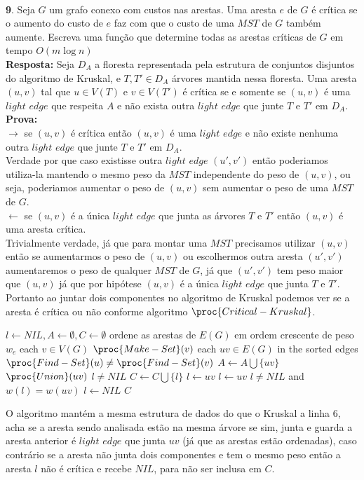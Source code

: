 \\[6pt]
\noindent \textbf{9}. Seja $G$ um grafo conexo com custos nas arestas. Uma aresta $e$ de $G$ é crítica se o aumento do custo de $e$ faz com que o custo de uma $MST$ de $G$ também aumente. Escreva uma função que determine todas as arestas críticas de $G$ em tempo $O(m \log n)$
\\[6pt]
\noindent \textbf{Resposta:} Seja $D_A$ a floresta representada pela estrutura de conjuntos disjuntos do algoritmo de Kruskal, e $T, T' \in D_A$ árvores mantida nessa floresta. Uma aresta $(u,v)$ tal que $u \in V(T)$ e $v \in V(T')$ é crítica se e somente se $(u,v)$ é uma $light$ $edge$ que respeita $A$ e não exista outra $light$ $edge$ que junte $T$ e $T'$ em $D_A$.
\\[6pt]
\noindent \textbf{Prova:}
\\[6pt]
\noindent $\rightarrow$ se $(u,v)$ é crítica então $(u,v)$ é uma $light$ $edge$ e não existe nenhuma outra $light$ $edge$ que junte $T$ e $T'$ em $D_A$.
\\[6pt] 
\noindent Verdade por que caso existisse outra $light$ $edge$ $(u',v')$ então poderiamos utiliza-la mantendo o mesmo peso da $MST$ independente do peso de $(u,v)$, ou seja, poderiamos aumentar o peso de $(u,v)$ sem aumentar o peso de uma $MST$ de $G$.
\\[6pt]
\noindent $\leftarrow$ se $(u,v)$ é a única $light$ $edge$ que junta as árvores $T$ e $T'$ então $(u,v)$ é uma aresta crítica.
\\[6pt]
\noindent Trivialmente verdade, já que para montar uma $MST$ precisamos utilizar $(u,v)$ então se aumentarmos o peso de $(u,v)$ ou escolhermos outra aresta $(u', v')$ aumentaremos o peso de qualquer $MST$ de $G$, já que $(u', v')$ tem peso maior que $(u, v)$ já que por hipótese $(u,v)$ é a única $light$ $edge$ que junta $T$ e $T'$.
\\[6pt]
\noindent Portanto ao juntar dois componentes no algoritmo de Kruskal podemos ver se a aresta é crítica ou não conforme algoritmo $\proc{Critical-Kruskal}$.

\begin{codebox}
 \li $l \gets NIL, A \gets \emptyset, C \gets \emptyset$
 \li ordene as arestas de $E(G)$ em ordem crescente de peso $w_e$
 \li \For each $v \in V(G)$
 \li \Do
	$\proc{Make-Set}(v)$
      \End
 \li \For each $uv \in E(G)$ in the sorted edges
 \li \Do
 	\If $\proc{Find-Set}(u) \neq \proc{Find-Set}(v)$
 \li	\Then
 	    $A \gets A \bigcup \{uv\}$
 \li	    $\proc{Union}(uv)$
 \li	    \If $l \neq NIL$
 \li	    \Then
 	       $C \gets C \bigcup \{l\}$
 	    \End
 \li	    $l \gets uv$
 \li	    $l \gets uv$
 	 \Else
 \li	    \If $l \neq NIL$ and $w(l) = w(uv)$
 \li	    \Then
 	      $l \gets NIL$
 	    \End
         \End
     \End 
 \li \Return $C$
\end{codebox}

\noindent O algoritmo mantém a mesma estrutura de dados do que o Kruskal a linha 6, acha se a aresta sendo analisada estão na mesma árvore se sim, junta e guarda a aresta anterior é $light$ $edge$ que junta $uv$ (já que as arestas estão ordenadas), caso contrário se a aresta não junta dois componentes e tem o mesmo peso então a aresta $l$ não é crítica e recebe $NIL$, para não ser inclusa em $C$.